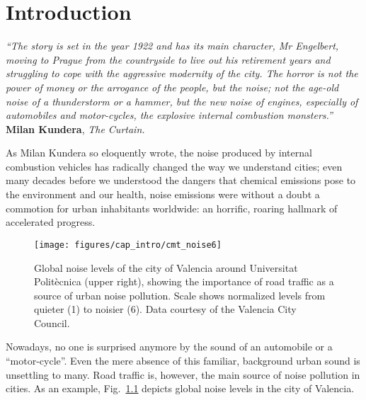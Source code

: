 \chapter{Introduction} \label{cap:intro}

\null\vspace{-10mm}
\begin{flushright}
\begin{minipage}[t]{0.66\textwidth}
{\itshape\small``The story is set in the year 1922 and has its main character, Mr Engelbert, moving to Prague from the countryside to live out his retirement years and struggling to cope with the aggressive modernity of the city. The horror is not the power of money or the arrogance of the people, but the noise; not the age-old noise of a thunderstorm or a hammer, but the new noise of engines, especially of automobiles and motor-cycles, the explosive internal combustion monsters.''}\\[-3mm]

{\cabincondensed\small\hfill \textbf{Milan Kundera}, \emph{The Curtain.}}\\[1mm]
\end{minipage}
\end{flushright}

\noindent As Milan Kundera so eloquently wrote, the noise produced by internal combustion vehicles has radically changed the way we understand cities; even many decades before we understood the dangers that chemical emissions pose to the environment and our health, noise emissions were without a doubt a commotion for urban inhabitants worldwide: an horrific, roaring hallmark of accelerated progress.

\begin{figure}[t!]
\centering
\texttt{[image: figures/cap\_intro/cmt\_noise6]}
\caption[Global noise levels of the city of Valencia]{Global noise levels of the city of Valencia around Universitat Politècnica (upper right), showing the importance of road traffic as a source of urban noise pollution. Scale shows normalized levels from quieter (1) to noisier (6). Data courtesy of the Valencia City Council.}
\label{fig:noise_valencia}
\end{figure}

Nowadays, no one is surprised anymore by the sound of an automobile or a ``motor-cycle''. Even the mere absence of this familiar, background urban sound is unsettling to many. Road traffic is, however, the main source of noise pollution in cities. As an example, Fig.~\ref{fig:noise_valencia} depicts global noise levels in the city of Valencia.

